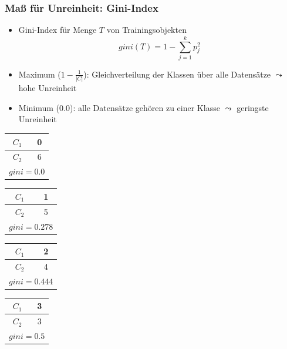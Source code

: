 
\begin{frame}
\frametitle{Maß für Unreinheit: Gini-Index}

\begin{itemize}
\item Gini-Index für Menge $T$ von Trainingsobjekten
$$
\textit{gini}(T) = 1 - \sum_{j=1}^k p_j^2
$$
\item Maximum ($1 - \frac{1}{|C|}$): Gleichverteilung der Klassen über
  alle Datensätze $\leadsto$ hohe Unreinheit
\item Minimum ($0.0$): alle Datensätze gehören zu einer Klasse
  $\leadsto$ geringste Unreinheit
\end{itemize}

\begin{tabular}{|c|c|}
\hline
$C_1$ & 0 \\
\hline
$C_2$ & 6 \\
\hline
\multicolumn{2}{|c|}{$\textit{gini}=0.0$}\\
\hline
\end{tabular}
\begin{tabular}{|c|c|}
\hline
$C_1$ & 1 \\
\hline
$C_2$ & 5 \\
\hline
\multicolumn{2}{|c|}{$\textit{gini}=0.278$}\\
\hline
\end{tabular}
\begin{tabular}{|c|c|}
\hline
$C_1$ & 2 \\
\hline
$C_2$ & 4 \\
\hline
\multicolumn{2}{|c|}{$\textit{gini}=0.444$}\\
\hline
\end{tabular}
\begin{tabular}{|c|c|}
\hline
$C_1$ & 3 \\
\hline
$C_2$ & 3 \\
\hline
\multicolumn{2}{|c|}{$\textit{gini}=0.5$}\\
\hline
\end{tabular}

\end{frame}


